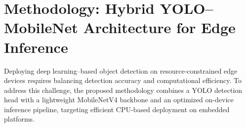 







\section{Methodology: Hybrid YOLO--MobileNet Architecture for Edge Inference}
\label{sec:yolo_mobilenet}

Deploying deep learning--based object detection on resource-constrained edge devices requires balancing detection accuracy and computational efficiency. To address this challenge, the proposed methodology combines a YOLO detection head with a lightweight MobileNetV4 backbone and an optimized on-device inference pipeline, targeting efficient CPU-based deployment on embedded platforms.

